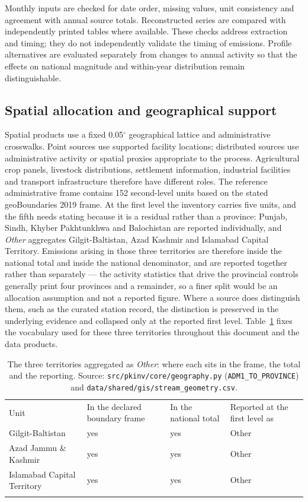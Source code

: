 \documentclass[essd]{copernicus}
\begin{document}
Monthly inputs are checked for date order, missing values, unit consistency and agreement with annual source totals. Reconstructed series are compared with independently printed tables where available. These checks address extraction and timing; they do not independently validate the timing of emissions. Profile alternatives are evaluated separately from changes to annual activity so that the effects on national magnitude and within-year distribution remain distinguishable.

\subsection{Spatial allocation and geographical support}
\label{sec:spatial}

Spatial products use a fixed 0.05$^{\circ}$ geographical lattice and administrative crosswalks. Point sources use supported facility locations; distributed sources use administrative activity or spatial proxies appropriate to the process. Agricultural crop panels, livestock distributions, settlement information, industrial facilities and transport infrastructure therefore have different roles. The reference administrative frame contains 152 second-level units based on the stated geoBoundaries 2019 frame. At the first level the inventory carries five units, and the fifth needs stating because it is a residual rather than a province: Punjab, Sindh, Khyber Pakhtunkhwa and Balochistan are reported individually, and \emph{Other} aggregates Gilgit-Baltistan, Azad Kashmir and Islamabad Capital Territory. Emissions arising in those three territories are therefore inside the national total and inside the national denominator, and are reported together rather than separately --- the activity statistics that drive the provincial controls generally print four provinces and a remainder, so a finer split would be an allocation assumption and not a reported figure. Where a source does distinguish them, such as the curated station record, the distinction is preserved in the underlying evidence and collapsed only at the reported first level.
Table~\ref{tab:other_units} fixes the vocabulary used for these three territories throughout this document and the data products.
\begin{table}[t]
\caption{The three territories aggregated as \emph{Other}: where each sits in the frame, the total and the reporting. Source: \texttt{src/pkinv/core/geography.py} (\texttt{ADM1\_TO\_PROVINCE}) and \texttt{data/shared/gis/stream\_geometry.csv}.}
\label{tab:other_units}
\begin{tabular}{llll}
\tophline
Unit & In the declared boundary frame & In the national total & Reported at the first level as \\
\middlehline
Gilgit-Baltistan & yes & yes & Other \\
Azad Jammu \& Kashmir & yes & yes & Other \\
Islamabad Capital Territory & yes & yes & Other \\
\bottomhline
\end{tabular}
\end{table}
\end{document}
